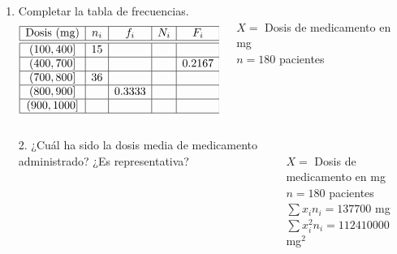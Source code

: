 \documentclass[aspectratio=149,10pt,xcolor=dvipsnames,t]{beamer}
\begin{document}
\begin{frame}
\begin{columns}
\begin{column}[T]{0.65\textwidth}
\begin{enumerate}
\item Completar la tabla de frecuencias.
\[
\begin{array}{|c|c|c|c|c|}
\hline
\textrm{Dosis (mg)} & n_i & f_i & N_i & F_i\\
\hline\hline
(100,400] & 15 & & & \\
\hline
(400,700] & & & & 0.2167\\
\hline
(700,800] & 36 & & & \\
\hline
(800,900] & & 0.3333 & &\\
\hline
(900,1000] & & & & \\
\hline
\end{array}
\]
\end{enumerate}
\end{column}
\begin{column}[T]{0.35\textwidth}
\\
$X=$ Dosis de medicamento en mg\\
$n=180$ pacientes
\end{column}
\end{columns}
\end{frame}


\begin{frame}
\begin{columns}
\begin{column}[T]{0.65\textwidth}
\begin{enumerate}
\item[2.] ¿Cuál ha sido la dosis media de medicamento administrado? ¿Es representativa?
\end{enumerate}
\end{column}
\begin{column}[T]{0.35\textwidth}
\\
$X=$ Dosis de medicamento en mg\\
$n=180$ pacientes
$\sum x_in_i=137700$ mg\\
$\sum x_i^2n_i=112410000$ mg$^2$
\end{column}
\end{columns}
\end{frame}
\end{document}
